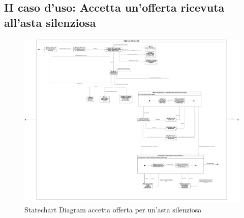         \subsection{II caso d'uso: Accetta un'offerta ricevuta all'asta silenziosa}
            \begin{figure}[htbp!]
            \centering
                \includegraphics[width=1\linewidth]{Immagini/Diagrammi/Statechart Diagram/AccettaOffertaSilenziosa.pdf}
            \caption{Statechart Diagram accetta offerta per un'asta silenziosa}
            \end{figure}